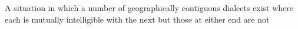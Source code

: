 A situation in which a number of geographically contiguous dialects exist where each is mutually intelligible with the next but those at either end are not
